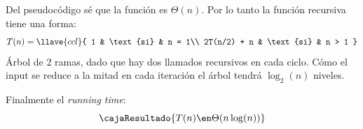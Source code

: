 Del pseudocódigo sé que la función \textit{} es $\Theta(n)$. Por lo tanto la función recursiva tiene
una forma:
$$
  T(n) =
  \llave{ccl}{
    1 & \text{si} & n = 1\\
    2T(n/2) + n & \text{si} & n > 1
  }
$$
Árbol de 2 ramas, dado que hay dos llamados recursivos en cada ciclo. Cómo el input se reduce a la mitad en cada
iteración el árbol tendrá $\log_2(n)$ niveles.

Finalmente el \textit{running time}:
$$
  \cajaResultado{
    T(n) \en \Theta(n \log(n))
  }
$$

\fin
